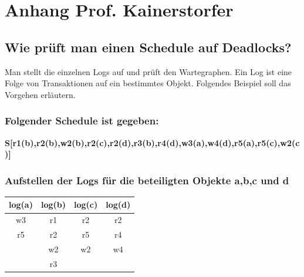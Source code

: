 \section{Anhang Prof. Kainerstorfer}
\subsection*{Wie prüft man einen Schedule auf Deadlocks?}
Man stellt die einzelnen Logs auf und prüft den Wartegraphen. Ein Log ist eine Folge von Transaktionen auf ein bestimmtes Objekt. Folgendes Beispiel soll das Vorgehen erläutern.

\subsubsection*{Folgender Schedule ist gegeben:}
\textbf{S[r1(b),r2(b),w2(b),r2(c),r2(d),r3(b),r4(d),w3(a),w4(d),r5(a),r5(c),w2(c)]}

\subsubsection*{Aufstellen der Logs für die beteiligten Objekte a,b,c und d}
\begin{center}
\begin{tabular}{| c | c | c | c |}
    \hline
    log(a) & log(b) & log(c) & log(d) \\
    \hline
    w3 & r1 & r2 & r2 \\
    r5 & r2 & r5 & r4 \\
     & w2 & w2 & w4 \\
     & r3 &  &  \\
    \hline
\end{tabular}
\end{center}

